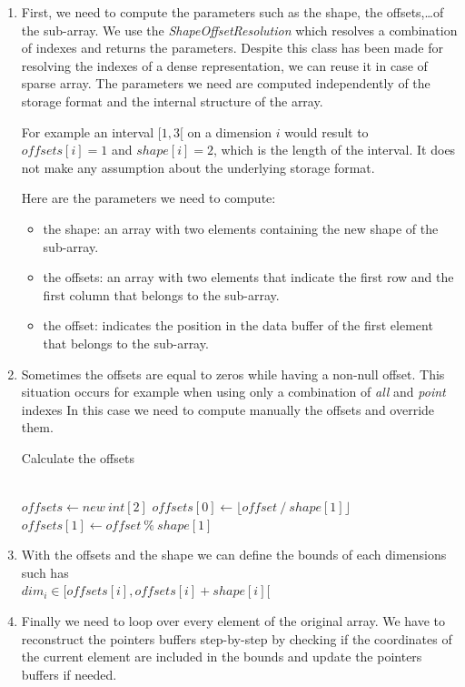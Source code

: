 \begin{enumerate}
\item First, we need to compute the parameters such as the shape, the offsets,\dots of the sub-array. We use the \textit{ShapeOffsetResolution} which resolves a combination of indexes and returns the parameters. Despite this class has been made for resolving the indexes of a dense representation, we can reuse it in case of sparse array. The parameters we need are computed independently of the storage format and the internal structure of the array.

For example an interval $[1, 3[$ on a dimension $i$ would result to $offsets[i] = 1$ and $shape[i] = 2$, which is the length of the interval. It does not make any assumption about the underlying storage format.

Here are the parameters we need to compute:
\begin{itemize}
	\item the shape: an array with two elements containing the new shape of the sub-array.
	\item the offsets: an array with two elements that indicate the first row and the first column that belongs to the sub-array.
	\item the offset: indicates the position in the data buffer of the first element that belongs to the sub-array.
\end{itemize}
 \item Sometimes the offsets are equal to zeros while having a non-null offset. This situation occurs for example when using only a combination of \textit{all} and \textit{point} indexes  In this case we need to compute manually the offsets and override them.
  
 \begin{algorithm}
 	\caption{Calculate the offsets}
 	\label{alg:sparseOffsets2d}
 	\begin{algorithmic}
 		\\
	 		\State $offsets \gets new\ int[2]$
	 		\State $offsets[0] \gets \lfloor offset\ /\ shape[1]\rfloor$
	 		\State $offsets[1] \gets offset\ \%\ shape[1]$
 		\EndProcedure
 	\end{algorithmic}
 \end{algorithm}
 
\item With the offsets and the shape we can define the bounds of each dimensions such has \\
$dim_{i} \in [offsets[i], offsets[i] + shape[i][$
\item Finally we need to loop over every element of the original array. We have to reconstruct the pointers buffers step-by-step by checking if the coordinates of the current element are included in the bounds and update the pointers buffers if needed.
\end{enumerate}

